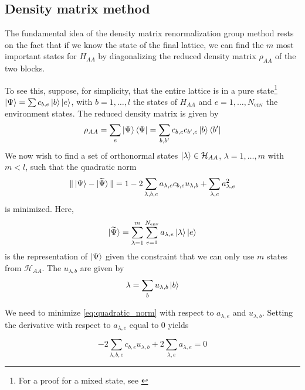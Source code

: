 \subsection{Density matrix method}

The fundamental idea of the density matrix renormalization group method
rests on the fact that if we know the state of the final lattice, we can find the $m$
most important states for $H_{AA}$ by diagonalizing the reduced density
matrix $\rho_{AA}$ of the two blocks.

To see this, suppose, for simplicity, that the entire lattice is in a pure
state\footnote{For a proof for a mixed state, see \cite{noack1999workshop}} $\ket{\Psi} = \sum c_{b, e} \ket{b} \ket{e}$, with $b = 1, \ldots, l$ the
states of $H_{AA}$ and $e = 1, \ldots, N_{\text{env}}$ the environment states. The
reduced density matrix is given by
\begin{equation}\label{eq:density_matrix_superblock}
  \rho_{AA} = \sum_{e} \ket{\Psi} \bra{\Psi} = \sum_{b, b'} c_{b, e} c_{b', e} \ket{b} \bra{b'}
\end{equation}
We now wish to find a set of orthonormal states $\ket{\lambda} \in \mathcal{H}_{AA}$,
$\lambda = 1, \ldots, m$ with $m < l$, such that the quadratic norm
\begin{equation}\label{eq:quadratic_norm}
  \Vert \ket{\Psi} - \ket{\widetilde{\Psi}} \Vert = 1 - 2 \sum_{\lambda, b, e} a_{\lambda, e} c_{b, e} u_{\lambda, b} + \sum_{\lambda, e} a_{\lambda, e}^2
\end{equation}
is minimized. Here,
\begin{equation}
  \ket{\widetilde{\Psi}} = \sum_{\lambda = 1}^{m} \sum_{e = 1}^{N_{\text{env}}} a_{\lambda, e} \ket{\lambda} \ket{e}
\end{equation}
is the representation of $\ket{\Psi}$ given the constraint that we can only use
$m$ states from $\mathcal{H}_{AA}$. The $u_{\lambda, b}$ are given by
\begin{equation}
  \lambda = \sum_{b} u_{\lambda, b} \ket{b}
\end{equation}

We need to minimize \eqref{eq:quadratic_norm} with respect to $a_{\lambda, e}$
and $u_{\lambda, b}$. Setting the derivative with respect to $a_{\lambda, e}$ equal to 0 yields

\begin{equation}
  -2 \sum_{\lambda, b, e} c_{b, e} u_{\lambda, b} + 2 \sum_{\lambda, e} a_{\lambda, e} = 0
\end{equation}

